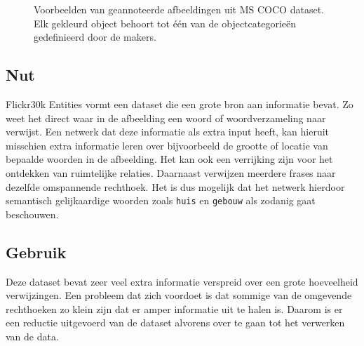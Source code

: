 \begin{figure}
    \centering
    \hfill
    \caption{Voorbeelden van geannoteerde afbeeldingen uit MS COCO dataset. Elk gekleurd object behoort tot \'e\'en van de objectcategorie\"en gedefinieerd door de makers.}
    \label{fig:cocoexamples}
\end{figure}

\subsection{Nut}
Flickr30k Entities vormt een dataset die een grote bron aan informatie bevat. Zo weet het direct waar in de afbeelding een woord of woordverzameling naar verwijst. Een netwerk dat deze informatie als extra input heeft, kan hieruit misschien extra informatie leren over bijvoorbeeld de grootte of locatie van bepaalde woorden in de afbeelding. Het kan ook een verrijking zijn voor het ontdekken van ruimtelijke relaties. Daarnaast verwijzen meerdere frases naar dezelfde omspannende rechthoek. Het is dus mogelijk dat het netwerk hierdoor semantisch gelijkaardige woorden zoals \texttt{huis} en \texttt{gebouw} als zodanig gaat beschouwen.


\subsection{Gebruik}
\label{sub:Gebruik}
Deze dataset bevat zeer veel extra informatie verspreid over een grote hoeveelheid verwijzingen. Een probleem dat zich voordoet is dat sommige van de omgevende rechthoeken zo klein zijn dat er amper informatie uit te halen is. Daarom is er een reductie uitgevoerd van de dataset alvorens over te gaan tot het verwerken van de data. 

